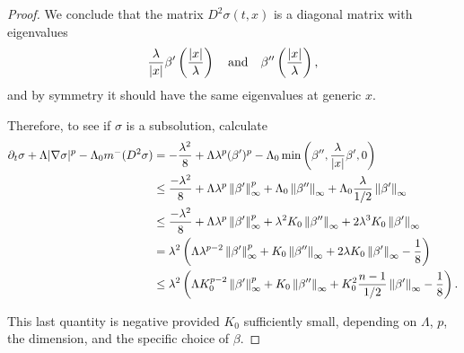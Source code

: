 \begin{proof}
We conclude that the matrix $D^2 \sigma (t,x)$ is a diagonal matrix with eigenvalues 
\[ \frac{\lambda}{|x|} \beta'\left( \frac{|x|}{\lambda} \right) \quad \textrm{and} \quad \beta''\left( \frac{|x|}{\lambda} \right), \]
and by symmetry it should have the same eigenvalues at generic $x$.  

Therefore, to see if $\sigma$ is a subsolution, calculate
\begin{align*}
\partial_t \sigma + \Lambda |\nabla \sigma|^p - \Lambda_0 m^-(D^2 \sigma) &= -\frac{\lambda^2}{8} + \Lambda \lambda^p (\beta')^p - \Lambda_0 \min\left( \beta'', \frac{\lambda}{|x|} \beta', 0 \right)
\\ &\leq \frac{-\lambda^2}{8} + \Lambda \lambda^p \left\lVert\beta'\right\rVert_\infty^p + \Lambda_0 \left\lVert\beta''\right\rVert_\infty + \Lambda_0 \frac{\lambda}{1/2} \left\lVert\beta'\right\rVert_\infty
\\ &\leq \frac{-\lambda^2}{8} + \Lambda \lambda^p \left\lVert\beta'\right\rVert_\infty^p + \lambda^2 K_0 \left\lVert\beta''\right\rVert_\infty + 2 \lambda^3 K_0 \left\lVert\beta'\right\rVert_\infty
\\ &= \lambda^2 \left( \Lambda \lambda^{p-2} \left\lVert\beta'\right\rVert_\infty^p + K_0 \left\lVert\beta''\right\rVert_\infty + 2 \lambda K_0 \left\lVert\beta'\right\rVert_\infty - \frac{1}{8} \right)
\\ &\leq \lambda^2 \left( \Lambda K_0^{p-2} \left\lVert\beta'\right\rVert_\infty^p + K_0 \left\lVert\beta''\right\rVert_\infty + K_0^2 \frac{n-1}{1/2} \left\lVert\beta'\right\rVert_\infty - \frac{1}{8} \right).
\end{align*}

This last quantity is negative provided $K_0$ sufficiently small, depending on $\Lambda$, $p$, the dimension, and the specific choice of $\beta$.  

\end{proof}

